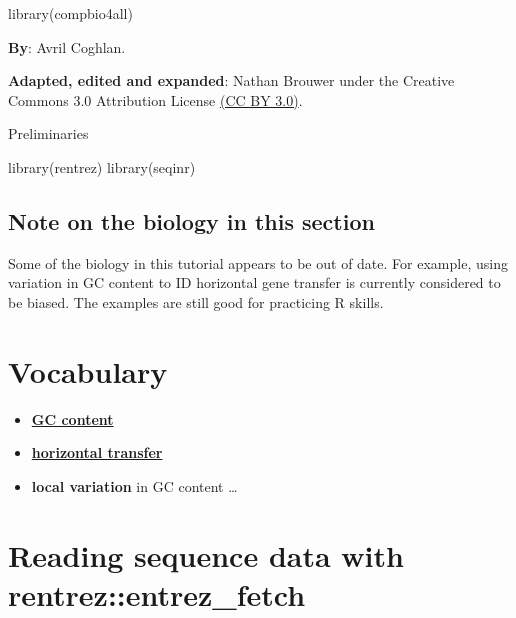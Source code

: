 \documentclass[
]{book}
\newenvironment{Shaded}{\begin{snugshade}}{\end{snugshade}}
\newcommand{\FunctionTok}[1]{\textcolor[rgb]{0.00,0.00,0.00}{#1}}
\newcommand{\NormalTok}[1]{#1}
\providecommand{\tightlist}{%
  \setlength{\itemsep}{0pt}\setlength{\parskip}{0pt}}
\begin{document}
\begin{Shaded}
\begin{Highlighting}[]
\FunctionTok{library}\NormalTok{(compbio4all)}
\end{Highlighting}
\end{Shaded}

\textbf{By}: Avril Coghlan.

\textbf{Adapted, edited and expanded}: Nathan Brouwer under the Creative Commons 3.0 Attribution License \href{https://creativecommons.org/licenses/by/3.0/}{(CC BY 3.0)}.

Preliminaries

\begin{Shaded}
\begin{Highlighting}[]
\FunctionTok{library}\NormalTok{(rentrez)}
\FunctionTok{library}\NormalTok{(seqinr)}
\end{Highlighting}
\end{Shaded}

\hypertarget{note-on-the-biology-in-this-section-1}{%
\subsection{Note on the biology in this section}\label{note-on-the-biology-in-this-section-1}}

Some of the biology in this tutorial appears to be out of date. For example, using variation in GC content to ID horizontal gene transfer is currently considered to be biased. The examples are still good for practicing R skills.

\hypertarget{vocabulary-2}{%
\section{Vocabulary}\label{vocabulary-2}}

\begin{itemize}
\tightlist
\item
  \href{https://en.wikipedia.org/wiki/GC-content}{\textbf{GC content}}
\item
  \href{en.wikipedia.org/wiki/Horizontal_gene_transfer}{\textbf{horizontal transfer}}
\item
  \textbf{local variation} in GC content \ldots{}
\end{itemize}

\hypertarget{reading-sequence-data-with-rentrezentrez_fetch}{%
\section{Reading sequence data with rentrez::entrez\_fetch}\label{reading-sequence-data-with-rentrezentrez_fetch}}
\end{document}
